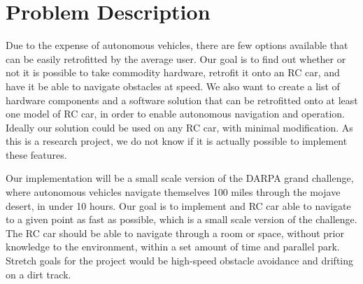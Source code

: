 \documentclass[draftclsnofoot,onecolumn,10pt]{IEEEtran}
\begin{document}
\section{Problem Description}
Due to the expense of autonomous vehicles, there are few options available that
can be easily retrofitted by the average user. Our goal is to find out whether
or not it is possible to take commodity hardware, retrofit it onto an RC car,
and have it be able to navigate obstacles at speed. We also want to create a
list of hardware components and a software solution that can be retrofitted onto
at least one model of RC car, in order to enable autonomous navigation and
operation. Ideally our solution could be used on any RC car, with minimal
modification. As this is a research project, we do not know if it is actually
possible to implement these features.\par
Our implementation will be a small scale version of the DARPA grand challenge,
where autonomous vehicles navigate themselves 100 miles through the mojave
desert, in under 10 hours. Our goal is to implement and RC car able to navigate
to a given point as fast as possible, which is a small scale version of the
challenge. The RC car should be able to navigate through a room or space,
without prior knowledge to the environment, within a set amount of time and
parallel park. Stretch goals for the project would be high-speed obstacle
avoidance and drifting on a dirt track.
\end{document}
